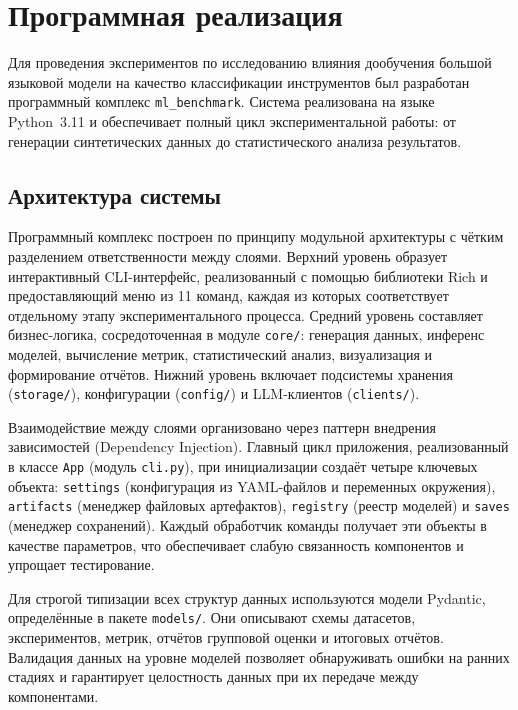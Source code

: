
\section{Программная реализация} \label{sec:implementation}

Для проведения экспериментов по исследованию влияния дообучения большой языковой модели на качество классификации инструментов был разработан программный комплекс \texttt{ml\_benchmark}. Система реализована на языке Python~3.11 и обеспечивает полный цикл экспериментальной работы: от генерации синтетических данных до статистического анализа результатов.

\subsection{Архитектура системы}

Программный комплекс построен по принципу модульной архитектуры с чётким разделением ответственности между слоями. Верхний уровень образует интерактивный CLI-интерфейс, реализованный с помощью библиотеки Rich и предоставляющий меню из 11 команд, каждая из которых соответствует отдельному этапу экспериментального процесса. Средний уровень составляет бизнес-логика, сосредоточенная в модуле \texttt{core/}: генерация данных, инференс моделей, вычисление метрик, статистический анализ, визуализация и формирование отчётов. Нижний уровень включает подсистемы хранения (\texttt{storage/}), конфигурации (\texttt{config/}) и LLM-клиентов (\texttt{clients/}).

Взаимодействие между слоями организовано через паттерн внедрения зависимостей (Dependency Injection). Главный цикл приложения, реализованный в классе \texttt{App} (модуль \texttt{cli.py}), при инициализации создаёт четыре ключевых объекта: \texttt{settings} (конфигурация из YAML-файлов и переменных окружения), \texttt{artifacts} (менеджер файловых артефактов), \texttt{registry} (реестр моделей) и \texttt{saves} (менеджер сохранений). Каждый обработчик команды получает эти объекты в качестве параметров, что обеспечивает слабую связанность компонентов и упрощает тестирование.

Для строгой типизации всех структур данных используются модели Pydantic, определённые в пакете \texttt{models/}. Они описывают схемы датасетов, экспериментов, метрик, отчётов групповой оценки и итоговых отчётов. Валидация данных на уровне моделей позволяет обнаруживать ошибки на ранних стадиях и гарантирует целостность данных при их передаче между компонентами.

